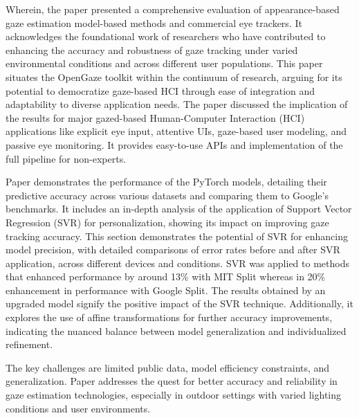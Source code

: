 \documentclass[conference]{IEEEtran}
\begin{document}
Wherein, the paper\cite{openGaze2} presented a comprehensive evaluation of appearance-based gaze estimation model-based methods and commercial eye trackers. It acknowledges the foundational work of researchers who have contributed to enhancing the accuracy and robustness of gaze tracking under varied environmental conditions and across different user populations. This paper\cite{openGaze2} situates the OpenGaze toolkit within the continuum of research, arguing for its potential to democratize gaze-based HCI through ease of integration and adaptability to diverse application needs. The paper\cite{openGaze2} discussed the implication of the results for major gazed-based Human-Computer Interaction (HCI) applications like explicit eye input, attentive UIs, gaze-based user modeling, and passive eye monitoring. It provides easy-to-use APIs and implementation of the full pipeline for non-experts. 

Paper\cite{openGaze1} demonstrates the performance of the PyTorch models, detailing their predictive accuracy across various datasets and comparing them to Google's benchmarks. It includes an in-depth analysis of the application of Support Vector Regression (SVR) for personalization, showing its impact on improving gaze tracking accuracy. This section demonstrates the potential of SVR for enhancing model precision, with detailed comparisons of error rates before and after SVR application, across different devices and conditions. SVR was applied to methods that enhanced performance by around 13\% with MIT Split\cite{gazecapture-1}  whereas in 20\% enhancement in performance with Google Split. The results obtained by an upgraded model signify the positive impact of the SVR technique.\cite{openGaze1} Additionally, it explores the use of affine transformations for further accuracy improvements, indicating the nuanced balance between model generalization and individualized refinement.

The key challenges are limited public data, model efficiency constraints, and generalization. Paper\cite{openGaze1}\cite{openGaze2} addresses the quest for better accuracy and reliability in gaze estimation technologies, especially in outdoor settings with varied lighting conditions and user environments.

\vspace{\baselineskip}
\end{document}
